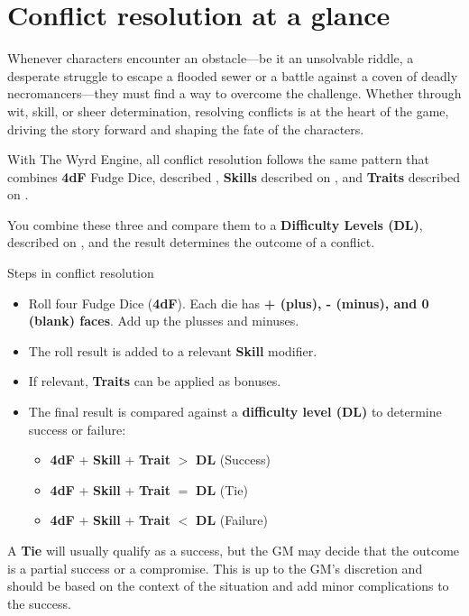 \section{Conflict resolution at a glance}

Whenever characters encounter an obstacle—be it an unsolvable riddle, a desperate struggle to escape a flooded sewer or a battle against a coven of deadly necromancers—they must find a way to overcome the challenge. Whether through wit, skill, or sheer determination, resolving conflicts is at the heart of the game, driving the story forward and shaping the fate of the characters.

With The Wyrd Engine, all conflict resolution follows the same pattern that combines \textbf{4dF} Fudge Dice, described , \textbf{Skills} described on , and \textbf{Traits} described on .

You combine these three and compare them to a \textbf{Difficulty Levels (DL)}, described on , and the result determines the outcome of a conflict.

\begin{Example}{Steps in conflict resolution}
	\begin{itemize}\raggedright
		\item Roll four Fudge Dice (\textbf{4dF}).
		      Each die has \textbf{+ (plus), - (minus), and 0 (blank) faces}. Add up the plusses and minuses.
		\item The roll result is added to a relevant \textbf{Skill} modifier.
		\item If relevant, \textbf{Traits} can be applied as bonuses.
		\item The final result is compared against a \textbf{difficulty level (DL)} to determine success or failure:
		\begin{itemize}
			\item \textbf{4dF} + \textbf{Skill} + \textbf{Trait} $>$ \textbf{DL} (Success)	
			\item \textbf{4dF} + \textbf{Skill} + \textbf{Trait} $=$ \textbf{DL} (Tie)
			\item \textbf{4dF} + \textbf{Skill} + \textbf{Trait} $<$ \textbf{DL} (Failure)
		\end{itemize}
	\end{itemize}
\end{Example}

A \textbf{Tie} will usually qualify as a success, but the GM may decide that the outcome is a partial success or a compromise. This is up to the GM's discretion and should be based on the context of the situation and add minor complications to the success.

